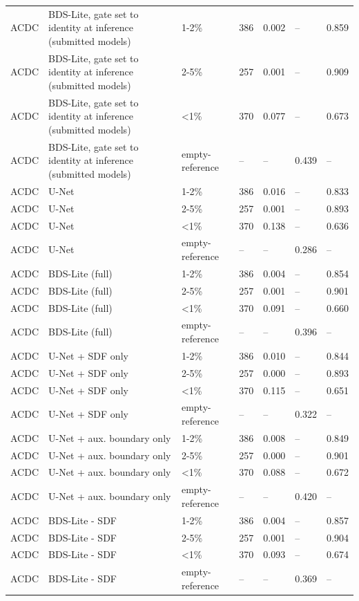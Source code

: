 \begin{tabular}{lllllll}
ACDC & BDS-Lite, gate set to identity at inference (submitted models) & 1-2\% & 386 & 0.002 & -- & 0.859 \\
ACDC & BDS-Lite, gate set to identity at inference (submitted models) & 2-5\% & 257 & 0.001 & -- & 0.909 \\
ACDC & BDS-Lite, gate set to identity at inference (submitted models) & <1\% & 370 & 0.077 & -- & 0.673 \\
ACDC & BDS-Lite, gate set to identity at inference (submitted models) & empty-reference & -- & -- & 0.439 & -- \\
ACDC & U-Net & 1-2\% & 386 & 0.016 & -- & 0.833 \\
ACDC & U-Net & 2-5\% & 257 & 0.001 & -- & 0.893 \\
ACDC & U-Net & <1\% & 370 & 0.138 & -- & 0.636 \\
ACDC & U-Net & empty-reference & -- & -- & 0.286 & -- \\
ACDC & BDS-Lite (full) & 1-2\% & 386 & 0.004 & -- & 0.854 \\
ACDC & BDS-Lite (full) & 2-5\% & 257 & 0.001 & -- & 0.901 \\
ACDC & BDS-Lite (full) & <1\% & 370 & 0.091 & -- & 0.660 \\
ACDC & BDS-Lite (full) & empty-reference & -- & -- & 0.396 & -- \\
ACDC & U-Net + SDF only & 1-2\% & 386 & 0.010 & -- & 0.844 \\
ACDC & U-Net + SDF only & 2-5\% & 257 & 0.000 & -- & 0.893 \\
ACDC & U-Net + SDF only & <1\% & 370 & 0.115 & -- & 0.651 \\
ACDC & U-Net + SDF only & empty-reference & -- & -- & 0.322 & -- \\
ACDC & U-Net + aux. boundary only & 1-2\% & 386 & 0.008 & -- & 0.849 \\
ACDC & U-Net + aux. boundary only & 2-5\% & 257 & 0.000 & -- & 0.901 \\
ACDC & U-Net + aux. boundary only & <1\% & 370 & 0.088 & -- & 0.672 \\
ACDC & U-Net + aux. boundary only & empty-reference & -- & -- & 0.420 & -- \\
ACDC & BDS-Lite - SDF & 1-2\% & 386 & 0.004 & -- & 0.857 \\
ACDC & BDS-Lite - SDF & 2-5\% & 257 & 0.001 & -- & 0.904 \\
ACDC & BDS-Lite - SDF & <1\% & 370 & 0.093 & -- & 0.674 \\
ACDC & BDS-Lite - SDF & empty-reference & -- & -- & 0.369 & -- \\

\end{tabular}
